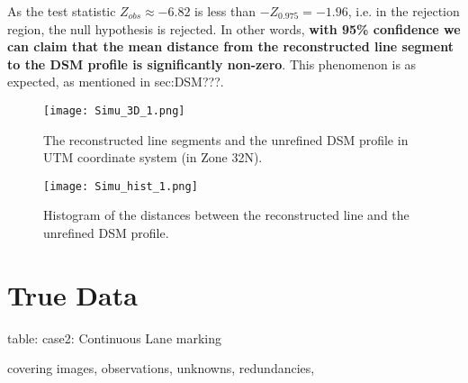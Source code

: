 As the test statistic $Z_{obs}\approx-6.82$ is less than $-Z_{0.975}=-1.96$, i.e. in the rejection region, the null hypothesis is rejected. In other words, \textbf{with 95\% confidence we can claim that the mean distance from the reconstructed line segment to the DSM profile is significantly non-zero}. This phenomenon is as expected, as mentioned in sec:DSM???. 


\begin{figure}
  \centering
  \texttt{[image: Simu\_3D\_1.png]} %
  \caption{\small The reconstructed line segments and the unrefined DSM profile in UTM coordinate system (in Zone 32N).}
  \label{fig:Simu3D_1}
  \vspace{1cm}
  \texttt{[image: Simu\_hist\_1.png]}
  \caption{\small Histogram of the distances between the reconstructed line and the unrefined DSM profile.}
  \label{fig:SimuHist_1}
\end{figure}

\clearpage


 





\section{True Data}
\label{sec:truedata}

table:
case2: Continuous Lane marking%

covering images, observations, unknowns, redundancies, 





